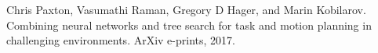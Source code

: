 \documentclass[letterpaper, 10 pt, conference]{ieeeconf}  %
\begin{document}







\begin{thebibliography}{99}
 Chris Paxton, Vasumathi Raman, Gregory D Hager, and Marin Kobilarov. Combining neural networks and tree search for task and motion planning in challenging environments. ArXiv e-prints, 2017.
\end{thebibliography}
\end{document}
